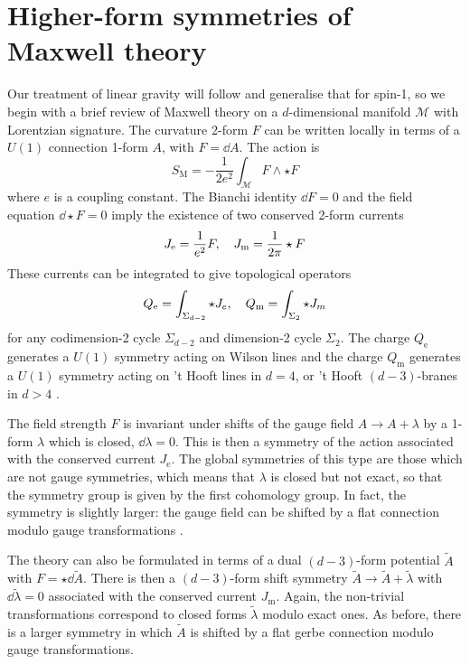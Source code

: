 \section{Higher-form symmetries of Maxwell theory}
\label{sec:maxwell}

Our treatment of linear gravity will follow and generalise that for spin-1, so we begin with a brief review of Maxwell theory on a $d$-dimensional manifold $\mathcal{M}$ with Lorentzian signature. The curvature 2-form $F$ can be written locally in terms of a $U(1)$ connection 1-form $A$, with $F=\dd{A}$. The action is
\begin{equation}\label{eq:S_Maxwell}
    S_{\text{M}} = -\frac{1}{2e^2} \int_{\mathcal{M}} F \wedge \star F
\end{equation}
where $e$ is a coupling constant.
The Bianchi identity $\dd{F} = 0$ and the field equation $\dd\star F=0$ imply the existence of two conserved 2-form currents
\begin{equation}
    J_{\text{e}} = \frac{1}{e^2} F\qc J_{\text{m}} = \frac{1}{2\pi} \star F
\end{equation}
These currents can  be integrated to give
 topological operators 
\begin{equation}\label{eq:Q_m}
    Q_{\text{e}} = \int_{\Sigma_{d-2}} \star J_e\qc Q_{\text{m}} = \int_{\Sigma_2} \star J_m
\end{equation}
for any codimension-2 cycle $\Sigma_{d-2}$ and dimension-2 cycle $\Sigma_2$.
The charge $Q_{\text{e}}$ generates a $U(1)$ symmetry acting on Wilson lines and the charge  $Q_{\text{m}}$ generates a $U(1)$ symmetry acting on 't Hooft lines in $d=4$, or 't Hooft $(d-3)$-branes in $d>4$ \cite{Gaiotto2015GeneralizedSymmetries}.

The field strength $F$ is invariant under shifts of the gauge field $A\to A+\lambda$ by a 1-form $\lambda$ which is closed, $\dd\lambda=0$. 
This is then a symmetry of the action associated with the conserved current $J_{\text{e}}$.
The global symmetries of this type are those which are not gauge symmetries, which means that $\lambda $ is closed but not exact, so that the symmetry group is given by the first cohomology group.
In fact, the symmetry is slightly larger: the gauge field can be shifted by a flat connection modulo gauge transformations \cite{Gaiotto2015GeneralizedSymmetries}.

The theory can also be formulated in terms of a dual $(d-3)$-form potential $\tilde{A}$ with $F=\star \dd \tilde{A}$. There is then a $(d-3)$-form shift symmetry $\tilde{A}\to \tilde{A} + \tilde{\lambda}$ with $\dd\tilde \lambda=0$ associated with the conserved current $J_{\text{m}}$. 
Again, the non-trivial transformations correspond to closed forms $\tilde{\lambda}$ modulo exact ones.
As before, there is a larger symmetry in which $\tilde{A}$ is shifted by a flat gerbe connection modulo gauge transformations.


